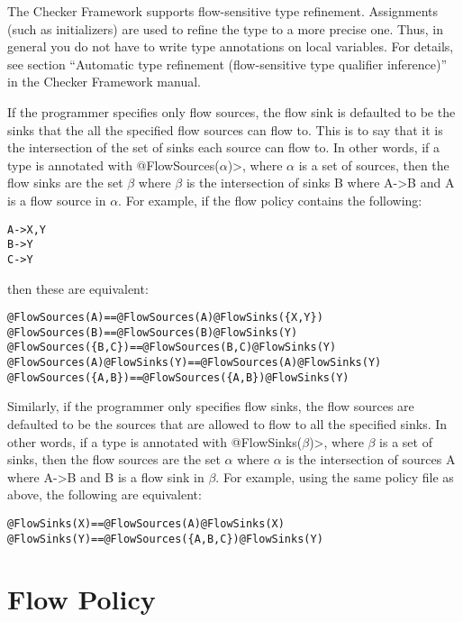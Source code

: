 The Checker Framework supports flow-sensitive type refinement.  Assignments (such as
initializers) are used to refine the type to a more precise one.  Thus, in
general you do not have to write type annotations on local variables.  For
details, see section ``Automatic type refinement (flow-sensitive type
qualifier inference)'' in the Checker Framework manual.

If the programmer specifies only flow sources, the flow sink is defaulted
to be the
sinks that the all the specified flow sources can flow to. This is to say that 
it is the intersection of the set of sinks each source can flow to.
 In other words, if a type is annotated with 
\<@FlowSources($\alpha$)>, where $\alpha$ is a set of sources, then the flow sinks are the set 
$\beta$ where $\beta$ is the intersection of sinks B where A-\textgreater B and A is a flow source in 
$\alpha$.  For example, if the flow policy contains the following:

\begin{alltt}
  A->X,Y
  B->Y
  C->Y
\end{alltt}
  
\noindent 
then these are equivalent:

\begin{alltt}
  @FlowSources(A)                 ==   @FlowSources(A) @FlowSinks(\{X, Y\})
  @FlowSources(B)                 ==   @FlowSources(B) @FlowSinks(Y)
  @FlowSources(\{B,C\})             ==   @FlowSources(B,C) @FlowSinks(Y)
  @FlowSources(A) @FlowSinks(Y)   ==   @FlowSources(A) @FlowSinks(Y) 
  @FlowSources(\{A,B\})             ==   @FlowSources(\{A,B\}) @FlowSinks(Y)
\end{alltt}


Similarly, if the programmer only specifies flow sinks, the flow sources are defaulted to be the sources 
that are allowed to flow to all the specified sinks.  In other words, if a type is annotated with 
\<@FlowSinks($\beta$)>, where $\beta$ is a set of sinks, then the flow sources are the set 
$\alpha$ where $\alpha$ is the intersection of sources A where A-\textgreater B and B is a flow sink in 
$\beta$. For example, using the same policy file as above, the following are equivalent:

\begin{alltt}
  @FlowSinks(X)                   ==   @FlowSources(A) @FlowSinks(X)
  @FlowSinks(Y)                   ==   @FlowSources(\{A,B,C\}) @FlowSinks(Y)
\end{alltt}

\section{Flow Policy}
\label{sec:flowpolicy}

